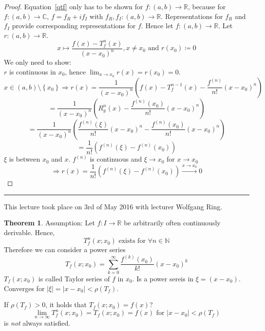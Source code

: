 \documentclass[a4paper,landscape,twocolumn]{article}
\theoremstyle{definition}
\newtheorem{theorem}{Theorem}
\newcommand\set[1]{\left\{#1\right\}}
\newcommand\abs[1]{\left|#1\right|}
\newcommand\meta[3]{\hrule{} This #1 took place on #2 with lecturer #3.\par}
\begin{document}
\begin{proof}
  Equation~\ref{qtf} only has to be shown for $f: (a,b) \to \mathbb R$,
  because for $f: (a,b) \to \mathbb C$, $f = f_R + i f_I$ with $f_R, f_I: (a,b) \to \mathbb R$.
  Representations for $f_R$ and $f_I$ provide corresponding representations for $f$.
  Hence let $f: (a,b) \to \mathbb R$. Let $r: (a,b) \to \mathbb R$.
  \[ x \mapsto \frac{f(x) - T_f^n(x)}{(x - x_0)^n}, x \neq x_0 \text{ and } r(x_0) \coloneqq 0 \]
  We only need to show: \\
  $r$ is continuous in $x_0$, hence $\lim_{x\to x_0} r(x) = r(x_0) = 0$.
  \[
    x \in (a,b) \setminus \set{x_0} \Rightarrow
    r(x) = \frac{1}{(x - x_0)^n} \left(f(x) - T_f^{n-1}(x) - \frac{f^{(n)}}{n!} (x - x_0)^n\right)
  \] \[
    = \frac{1}{(x - x_0)^n} \left(R_g^n(x) - \frac{f^{(n)}(x_0)}{n!} (x - x_0)^n\right)
  \] \[
    = \frac{1}{(x - x_0)^n} \left(\frac{f^{(n)}(\xi)}{n!} (x - x_0)^n - \frac{f^{(n)}(x_0)}{n!} (x - x_0)^n\right)
  \] \[
    = \frac{1}{n!} \left(f^{(n)}(\xi) - f^{(n)}(x_0)\right)
  \]
  $\xi$ is between $x_0$ and $x$.
  $f^{(n)}$ is continuous and $\xi \to x_0$ for $x \to x_0$
  \[ \Rightarrow r(x) = \frac{1}{n!}(f^{(n)}(\xi) - f^{(n)}(x_0)) \overset{x \to x_0}{\to} 0 \]
\end{proof}

\meta{lecture}{3rd of May 2016}{Wolfgang Ring}

\begin{theorem}
  Assumption:
  Let $f: I \to \mathbb R$ be arbitrarily often continuously derivable.
  Hence,
  \[ T_f^n(x; x_0) \text{ exists for } \forall n \in \mathbb N \]
  Therefore we can consider a power series
  \[ T_f(x; x_0) = \sum_{k=0}^\infty \frac{f^{(k)}(x_0)}{k!} (x - x_0)^k \]
  $T_f(x; x_0)$ is called Taylor series of $f$ in $x_0$.
  Is a power sereis in $\xi = (x - x_0)$.
  Converges for $\abs{\xi} = \abs{x - x_0} < \rho(T_f)$.

  If $\rho(T_f) > 0$, it holds that $T_f(x;x_0) = f(x)$?
  \[ \lim_{n\to\infty} T_f^n(x; x_0) = T_f(x; x_0) = f(x) \text{ for } \abs{x - x_0} < \rho(T_f) \]
  is \emph{not} always satisfied.
\end{theorem}
\end{document}
